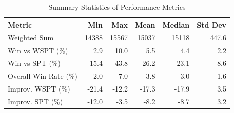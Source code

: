 \begin{table}[htbp]%
\centering%
\begin{tabular}{lrrrrr}%
\toprule%
\textbf{Metric}&\textbf{Min}&\textbf{Max}&\textbf{Mean}&\textbf{Median}&\textbf{Std Dev}\\%
\midrule%
Weighted Sum&14388&15567&15037&15118&447.6\\%
Win vs WSPT (\%)&2.9&10.0&5.5&4.4&2.2\\%
Win vs SPT (\%)&15.4&43.8&26.2&23.1&8.6\\%
Overall Win Rate (\%)&2.0&7.0&3.8&3.0&1.6\\%
Improv. WSPT (\%)&-21.4&-12.2&-17.3&-17.9&3.5\\%
Improv. SPT (\%)&-12.0&-3.5&-8.2&-8.7&3.2\\%
\bottomrule%
\end{tabular}%
\caption{Summary Statistics of Performance Metrics}%
\label{tab:metrics}%
\end{table}